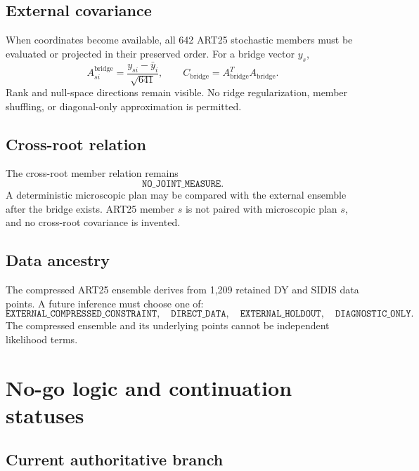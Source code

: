 \documentclass[11pt]{article}
\begin{document}
\subsection{External covariance}

When coordinates become available, all 642 ART25 stochastic members must be evaluated or projected in their preserved order.  For a bridge vector \(y_s\),
\begin{equation}
 A_{si}^{\mathrm{bridge}}
 =
 \frac{y_{si}-\bar y_i}{\sqrt{641}},
 \qquad
 C_{\mathrm{bridge}}
 =
 A_{\mathrm{bridge}}^T A_{\mathrm{bridge}}.
 \label{eq:bridge-anomaly}
\end{equation}
Rank and null-space directions remain visible.  No ridge regularization, member shuffling, or diagonal-only approximation is permitted.

\subsection{Cross-root relation}

The cross-root member relation remains
\begin{equation}
 \boxed{\texttt{NO\_JOINT\_MEASURE}}.
 \label{eq:no-joint}
\end{equation}
A deterministic microscopic plan may be compared with the external ensemble after the bridge exists.  ART25 member \(s\) is not paired with microscopic plan \(s\), and no cross-root covariance is invented.

\subsection{Data ancestry}

The compressed ART25 ensemble derives from 1,209 retained DY and SIDIS data points.  A future inference must choose one of:
\begin{equation}
 \texttt{EXTERNAL\_COMPRESSED\_CONSTRAINT},
 \quad
 \texttt{DIRECT\_DATA},
 \quad
 \texttt{EXTERNAL\_HOLDOUT},
 \quad
 \texttt{DIAGNOSTIC\_ONLY}.
 \label{eq:ancestry-plans}
\end{equation}
The compressed ensemble and its underlying points cannot be independent likelihood terms.

\section{No-go logic and continuation statuses}
\label{sec:no-go}

\subsection{Current authoritative branch}
\end{document}
